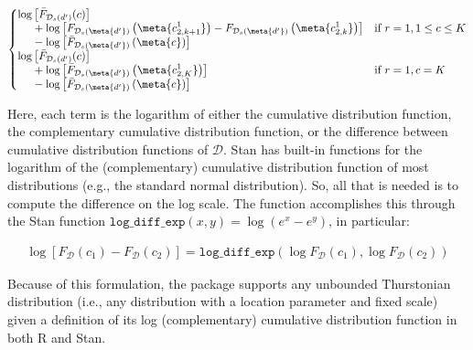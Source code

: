 \begin{align*}
\begin{cases}
\begin{aligned}
            \log&\left[\bar{F}_{\mathcal{D}_{s}(d')}(c)\right] \\
            &+ \log\left[F_{\mathcal{D}_s(\meta{d'})}\left(\meta{c_{2,k+1}^1}\right) -
            F_{\mathcal{D}_s(\meta{d'})}\left(\meta{c_{2,k}^1}\right)\right] \\
            &- \log\left[\bar{F}_{\mathcal{D}_s(\meta{d'})}\left(\meta{c}\right)\right]
        \end{aligned} & \textrm{if } r=1, 1 \le c \le K \\
        \begin{aligned}
            \log&\left[\bar{F}_{\mathcal{D}_{s}(d')}(c)\right] \\
            &+ \log\left[\bar{F}_{\mathcal{D}_s(\meta{d'})}\left(\meta{c_{2,K}^1}\right)\right] \\
            &- \log\left[\bar{F}_{\mathcal{D}_s(\meta{d'})}\left(\meta{c}\right)\right]    
        \end{aligned}
        & \textrm{if } r=1, c = K
    \end{cases}
\end{align*}

Here, each term is the logarithm of either the cumulative distribution function, the complementary cumulative distribution function, or the difference between cumulative distribution functions of $\mathcal{D}$. Stan has built-in functions for the logarithm of the (complementary) cumulative distribution function of most distributions (e.g., the standard normal distribution). So, all that is needed is to compute the difference on the log scale. The \hmetad{} function accomplishes this through the Stan function $\texttt{log\_diff\_exp}(x,y) = \log(e^x - e^y)$, in particular:

\begin{align*}
    \log\left[F_\mathcal{D}(c_1) - F_\mathcal{D}(c_2) \right] = \texttt{log\_diff\_exp}\!\left(\log F_\mathcal{D}(c_1), \log F_\mathcal{D}(c_2)\right)
\end{align*}

Because of this formulation, the \hmetad{} package supports any unbounded Thurstonian distribution (i.e., any distribution with a location parameter and fixed scale) given a definition of its log (complementary) cumulative distribution function in both R and Stan.